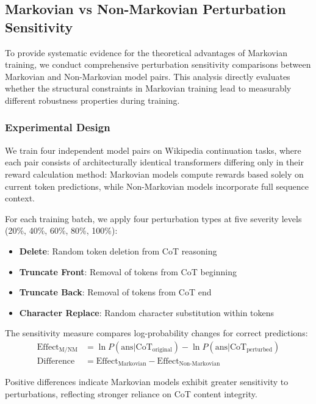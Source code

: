 \documentclass{article} %
\begin{document}
\subsection{Markovian vs Non-Markovian Perturbation Sensitivity}\label{subsec:markovian_sensitivity}

To provide systematic evidence for the theoretical advantages of Markovian training, we conduct comprehensive perturbation sensitivity comparisons between Markovian and Non-Markovian model pairs. This analysis directly evaluates whether the structural constraints in Markovian training lead to measurably different robustness properties during training.

\subsubsection{Experimental Design}
We train four independent model pairs on Wikipedia continuation tasks, where each pair consists of architecturally identical transformers differing only in their reward calculation method: Markovian models compute rewards based solely on current token predictions, while Non-Markovian models incorporate full sequence context.

For each training batch, we apply four perturbation types at five severity levels (20\%, 40\%, 60\%, 80\%, 100\%):
\begin{itemize}
    \item \textbf{Delete}: Random token deletion from CoT reasoning
    \item \textbf{Truncate Front}: Removal of tokens from CoT beginning  
    \item \textbf{Truncate Back}: Removal of tokens from CoT end
    \item \textbf{Character Replace}: Random character substitution within tokens
\end{itemize}

The sensitivity measure compares log-probability changes for correct predictions:
\begin{align}
\text{Effect}_{\text{M/NM}} &= \ln P(\text{ans}|\text{CoT}_{\text{original}}) - \ln P(\text{ans}|\text{CoT}_{\text{perturbed}}) \\
\text{Difference} &= \text{Effect}_{\text{Markovian}} - \text{Effect}_{\text{Non-Markovian}}
\end{align}

Positive differences indicate Markovian models exhibit greater sensitivity to perturbations, reflecting stronger reliance on CoT content integrity.
\end{document}
